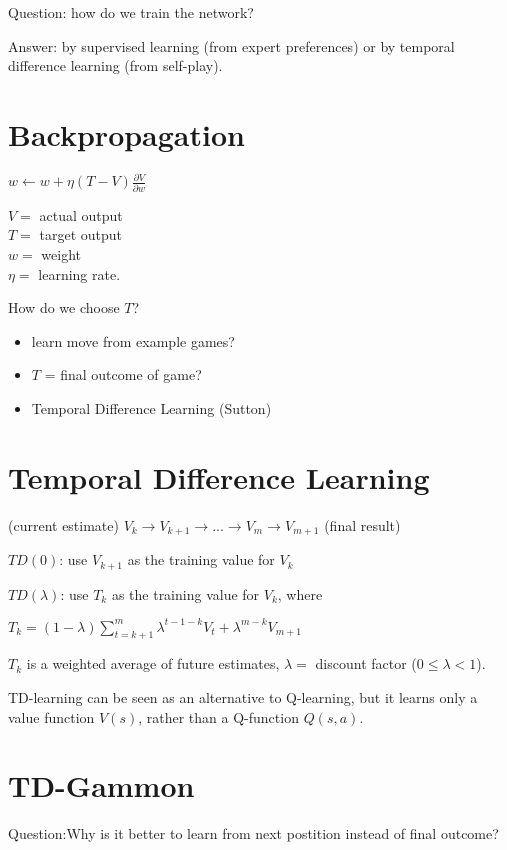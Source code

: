 Question: how do we train the network?

Answer: by supervised learning (from expert preferences) or by temporal
difference learning (from self-play).

\section{Backpropagation}
{\centering
    $w \leftarrow w + \eta(T - V)\frac{\partial V}{\partial w}$

}

$V = $ actual output\\
$T = $ target output\\
$w = $ weight\\
$\eta = $ learning rate.

How do we choose $T$?
\begin{itemize}
    \item learn move from example games?
    \item $T$ = final outcome of game?
    \item Temporal Difference Learning (Sutton)
\end{itemize}

\section{Temporal Difference Learning}
(current estimate) $V_k \rightarrow V_{k+1} \rightarrow ... \rightarrow V_m \rightarrow V_{m+1}$ (final result)

$TD(0)$: use $V_{k+1}$ as the training value for $V_k$

$TD(\lambda)$: use $T_k$ as the training value for $V_k$, where

{\centering
    $T_k = (1 - \lambda) \sum_{t = k + 1}^m \lambda^{t-1-k}V_t + \lambda^{m-k}V_{m+1}$

}

$T_k$ is a weighted average of future estimates, $\lambda = $ discount factor
($0 \leq \lambda < 1$).

TD-learning can be seen as an alternative to Q-learning, but it learns only a
value function $V(s)$, rather than a Q-function $Q(s,a)$.

\section{TD-Gammon}
Question:Why is it better to learn from next postition instead of final outcome?

